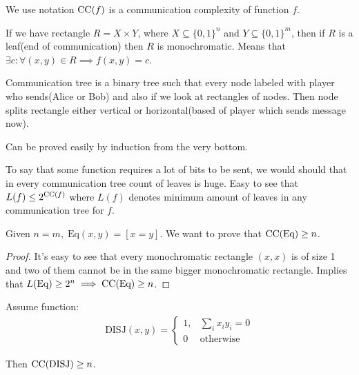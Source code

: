 \begin{prop}
	We use notation $\operatorname{CC}(f)$ is a communication complexity of function $f$. 
\end{prop}

\begin{remrk}
	If we have rectangle $R = X \times Y$, where $X \subseteq \{0, 1\}^n$ and $Y \subseteq \{0, 1\}^m$, then if $R$ is a leaf(end of communication) then $R$ is monochromatic. Means that $\exists c \colon \forall (x, y) \in R \implies f(x, y) = c$.
\end{remrk}

\begin{remrk}
	Communication tree is a binary tree such that every node labeled with player who sends(Alice or Bob) and also if we look at rectangles of nodes. Then node splits rectangle either vertical or horizontal(based of player which sends message now).
	
	Can be proved easily by induction from the very bottom.
\end{remrk}


\begin{remrk}
To say that some function requires a lot of bits to be sent, we would should that in every communication tree count of leaves is huge. 
Easy to see that $L(f) \leq 2^{\operatorname{CC}(f)}$ where $L(f)$ denotes minimum amount of leaves in any communication tree for $f$. 
	
\end{remrk}

\begin{thm}
	Given $n = m, \; \text{Eq}(x, y) = [x = y]$. We want to prove that $\operatorname{CC}(\text{Eq}) \geq n$.
\end{thm}

\begin{proof}
	It's easy to see that every monochromatic rectangle $(x, x)$ is of size 1 and two of them cannot be in the same bigger monochromatic rectangle. 
	Implies that $L(\text{Eq}) \geq 2^n \implies \operatorname{CC}(\text{Eq}) \geq n$.	
\end{proof}

\begin{thm}
	Assume function:
	\begin{align*}
		\text{DISJ}(x, y) = \begin{cases}
			1, & \sum\limits_i x_i y_i = 0 \\
			0 & \text{otherwise}
		\end{cases}
	\end{align*}
	
	Then $\operatorname{CC}(\text{DISJ}) \geq n$.
\end{thm}

